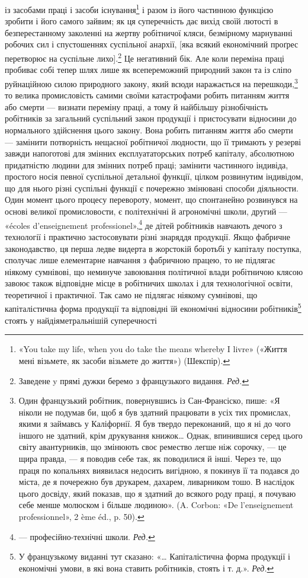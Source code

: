 \parcont{}  %
із засобами праці і засоби існування\footnote{
«You take my life, when you do take the means whereby I livre»
(«Життя мені візьмете, як засоби візьмете до життя») (Шекспір).
} і разом із його частинною
функцією зробити і його самого зайвим; як ця суперечність дає
вихід своїй лютості в безперестанному заколенні на жертву
робітничої кляси, безмірному марнуванні робочих сил і спустошеннях
суспільної анархії, [яка всякий економічний проґрес
перетворює на суспільне лихо].\footnote*{
Заведене y прямі дужки беремо з французького видання. \emph{Ред.}
}  Це негативний бік. Але коли
переміна праці пробиває собі тепер шлях лише як всепереможний
природний закон та із сліпо руйнаційною силою природного закону,
який всюди наражається на перешкоди,\footnote{
Один французький робітник, повернувшись із Сан-Франсіско,
пише: «Я ніколи не подумав би, щоб я був здатний працювати в усіх
тих промислах, якими я займавсь у Каліфорнії. Я був твердо переконаний,
що я ні до чого іншого не здатний, крім друкування книжок\dots{} Однак,
впинившися серед цього світу авантурників, що змінюють своє ремество
легше ніж сорочку, — це щира правда, — я поводив себе так, як поводилися
й інші. Через те, що праця по копальнях виявилася недосить вигідною,
я покинув її та подався до міста, де я почережно був друкарем, дахарем,
ливарником тошо. В наслідок цього досвіду, який показав, що я здатний
до всякого роду праці, я почуваю себе менше молюском і більше людиною».
(A. Corbon: «De l’enseignement professionnel», 2 ème éd., p. 50).
} то велика промисловість
самими своїми катастрофами робить питанням життя або
смерти — визнати переміну праці, а тому й найбільшу різнобічність
робітників за загальний суспільний закон продукції і
пристосувати відносини до нормального здійснення цього закону.
Вона робить питанням життя або смерти — замінити потворність
нещасної робітничої людности, що її тримають у резерві завжди
напоготові для змінних експлуататорських потреб капіталу,
абсолютною придатністю людини для змінних потреб праці;
замінити частинного індивіда, простого носія певної суспільної
детальної функції, цілком розвинутим індивідом, що для нього
різні суспільні функції є почережно змінювані способи діяльности.
Один момент цього процесу перевороту, момент, що спонтанейно
розвинувся на основі великої промисловости, є політехнічні й
агрономічні школи, другий — «écoles d’enseignement professionel»,\footnote*{
— професійно-технічні школи. \emph{Ред.}
}
де дітей робітників навчають дечого з технології і практично
застосовувати різні знаряддя продукції. Якщо фабричне законодавство,
ця перша ледве видерта в жорстокій боротьбі у капіталу
поступка, сполучає лише елементарне навчання з фабричною працею,
то не підлягає ніякому сумнівові, що неминуче завоювання
політичної влади робітничою клясою завоює також відповідне
місце в робітничих школах і для технологічної освіти, теоретичної
і практичної. Так само не підлягає ніякому сумнівові, що
капіталістична форма продукції та відповідні їй економічні відносини
робітників\footnote*{
У французькому виданні тут сказано: «\dots{} Капіталістична форма
продукції і економічні умови, в які вона ставить робітників, стоять
і т. д.». \emph{Ред.}
} стоять у найдіяметральнішій суперечності
\parbreak{}  %
